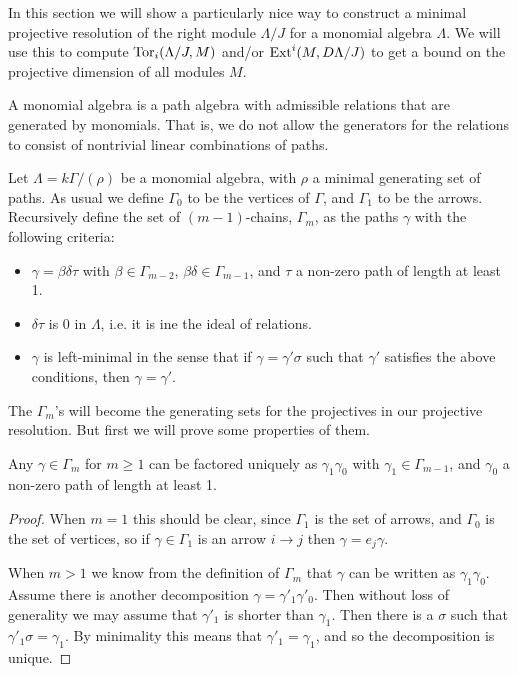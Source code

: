 \cite{GKK91, IgZa90}

In this section we will show a particularly nice way to construct a minimal projective resolution of the right module $\Lambda / J$ for a monomial algebra $\Lambda$. We will use this to compute $\operatorname{Tor}_i(\Lambda /J, M)$ and/or $\operatorname{Ext}^i(M, D\Lambda/J)$ to get a bound on the projective dimension of all modules $M$.

\begin{defn}
	A monomial algebra is a path algebra with admissible relations that are generated by monomials. That is, we do not allow the generators for the relations to consist of nontrivial linear combinations of paths.
\end{defn}

\begin{defn}[$m$-chains]\cite{GKK91}
	Let $\Lambda = k\Gamma / (\rho)$ be a monomial algebra, with $\rho$ a minimal generating set of paths. As usual we define $\Gamma_0$ to be the vertices of $\Gamma$, and $\Gamma_1$ to be the arrows. Recursively define the set of $(m-1)$-chains, $\Gamma_m$, as the paths $\gamma$ with the following criteria:
	\begin{itemize}
		\item $\gamma = \beta\delta\tau$ with $\beta \in \Gamma_{m-2}$, $\beta\delta \in \Gamma_{m-1}$, and $\tau$ a non-zero path of length at least 1.
		\item $\delta\tau$ is 0 in $\Lambda$, i.e. it is ine the ideal of relations.
		\item $\gamma$ is left-minimal in the sense that if $\gamma = \gamma' \sigma$ such that $\gamma'$ satisfies the above conditions, then $\gamma = \gamma'$.
	\end{itemize}
\end{defn}

The $\Gamma_m$'s will become the generating sets for the projectives in our projective resolution. But first we will prove some properties of them.

\begin{lemma}
	Any $\gamma\in \Gamma_m$ for $m \geq 1$ can be factored uniquely as $\gamma_1\gamma_0$ with $\gamma_1 \in \Gamma_{m-1}$, and $\gamma_0$ a non-zero path of length at least 1.
	\begin{proof}
		When $m=1$ this should be clear, since $\Gamma_1$ is the set of arrows, and $\Gamma_0$ is the set of vertices, so if $\gamma \in \Gamma_1$ is an arrow $i\to j$ then $\gamma = e_j\gamma$.
		
		When $m > 1$ we know from the definition of $\Gamma_m$ that $\gamma$ can be written as $\gamma_1\gamma_0$. Assume there is another decomposition $\gamma = \gamma'_1\gamma'_0$. Then without loss of generality we may assume that $\gamma'_1$ is shorter than $\gamma_1$. Then there is a $\sigma$ such that $\gamma'_1\sigma = \gamma_1$. By minimality this means that $\gamma'_1=\gamma_1$, and so the decomposition is unique.
	\end{proof} 
\end{lemma} 

